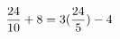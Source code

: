 \documentclass[preview]{standalone}
\begin{document}
\begin{align*}
\special{dvisvgm:raw <g id='unique000'>}\frac{24}{10} + 8 = 3(\frac{24}{5}) - 4\special{dvisvgm:raw </g>}
\end{align*}
\end{document}
